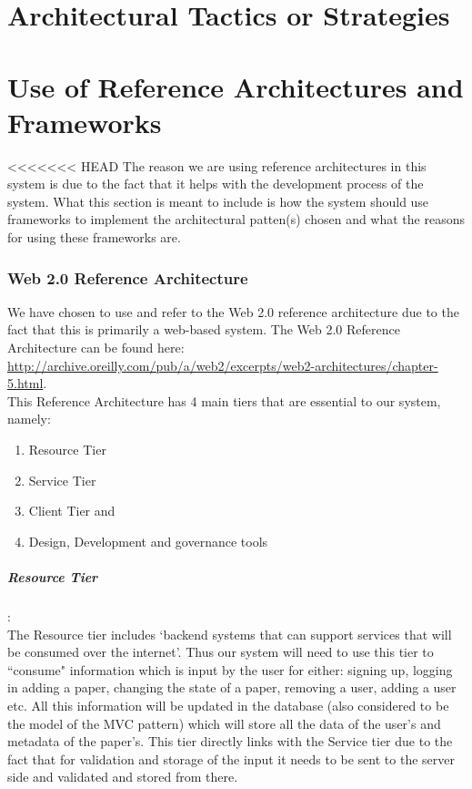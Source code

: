\documentclass[a4paper,12pt]{article}
\begin{document}
\section{Architectural Tactics or Strategies}

\section{Use of Reference Architectures and Frameworks}
<<<<<<< HEAD
The reason we are using reference architectures in this system is due to the fact that it helps with the development process of the system. What this section is meant to include is how the system should use frameworks to implement the architectural patten(s) chosen and what the reasons for using these frameworks are. \\

\subsubsection{Web 2.0 Reference Architecture}
\noindent
We have chosen to use and refer to the Web 2.0 reference architecture due to the fact that this is primarily a web-based system. The Web 2.0 Reference Architecture can be found here: \url{http://archive.oreilly.com/pub/a/web2/excerpts/web2-architectures/chapter-5.html}.\\

\noindent
This Reference Architecture has 4 main tiers that are essential to our system, namely:
\begin{enumerate}
	\item Resource Tier
	\item Service Tier
	\item Client Tier and
	\item Design, Development and governance tools
\end{enumerate}

\subparagraph{Resource Tier}\hspace{-10pt}:\\
The Resource tier includes `backend systems that can support services that will be consumed over the internet'. Thus our system will need to use this tier to ``consume" information which is input by the user for either: signing up, logging in adding a paper, changing the state of a paper, removing a user, adding a user etc. All this information will be updated in the database (also considered to be the model of the MVC pattern) which will store all the data of the user's and metadata of the paper's. This tier directly links with the Service tier due to the fact that for validation and storage of the input it needs to be sent to the server side and validated and stored from there. 
\end{document}
